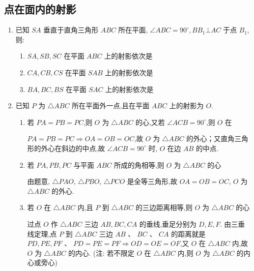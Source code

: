 \subsection*{点在面内的射影}
\begin{enumerate}
    \item 已知 ${SA}$ 垂直于直角三角形 ${ABC}$ 所在平面, $\angle {ABC} = {90}^{ \circ  },B{B}_{1}\bot {AC}$ 于点 ${B}_{1}$,则:
    \begin{enumerate}
        \item ${SA},{SB},{SC}$ 在平面 ${ABC}$ 上的射影依次是
        \item ${CA},{CB},{CS}$ 在平面 ${SAB}$ 上的射影依次是
        \item ${BA},{BC},{BS}$ 在平面 ${SAC}$ 上的射影依次是
    \end{enumerate}
    \item 已知 $P$ 为 $\bigtriangleup {ABC}$ 所在平面外一点,且在平面 ${ABC}$ 上的射影为 $O$.
    \begin{enumerate}
        \item 若 ${PA} = {PB} = {PC}$,则 $O$ 为 $\bigtriangleup  {ABC}$ 的心,又若 $\angle {ACB} = {90}^{ \circ  }$,则 $O$ 在
        \begin{jieda}
            ${PA} = {PB} = {PC} \Longrightarrow  {OA} = {OB} = {OC}$,故 $O$ 为 $\bigtriangleup  {ABC}$ 的外心；又直角三角形的外心在斜边的中点,故 $\angle {ACB} = {90}^{ \circ  }$ 时, $O$ 在边 ${AB}$ 的中点.
        \end{jieda}
        \item 若 ${PA},{PB},{PC}$ 与平面 ${ABC}$ 所成的角相等,则 $O$ 为 $\bigtriangleup  {ABC}$ 的心
        \begin{jieda}
            由题意, $\bigtriangleup {PAO}$, $\bigtriangleup {PBO}$, $\bigtriangleup {PCO}$ 是全等三角形,故 ${OA} = {OB} = {OC}$, $O$ 为 $\bigtriangleup {ABC}$ 的外心.
        \end{jieda}
        \item 若 $O$ 在 $\bigtriangleup {ABC}$ 内,且 $P$ 到 $\bigtriangleup {ABC}$ 的三边距离相等,则 $O$ 为 $\bigtriangleup {ABC}$ 的心
        \begin{jieda}
            过点 $O$ 作 $\bigtriangleup {ABC}$ 三边 ${AB},{BC},{CA}$ 的垂线,垂足分别为 $D,E,F$. 由三垂线定理,点 $P$ 到 $\bigtriangleup {ABC}$ 三边 ${AB}$ 、 ${BC}\text{ 、 }{CA}$ 的距离就是 ${PD},{PE},{PF}\text{ 、 }{PD} = {PE} = {PF} \Longrightarrow  {OD} = {OE} = {OF}$,又 $O$ 在 $\bigtriangleup {ABC}$ 内,故 $O$ 为 $\bigtriangleup {ABC}$ 的内心. (注: 若不限定 $O$ 在 $\bigtriangleup {ABC}$ 内,则 $O$ 为 $\bigtriangleup {ABC}$ 的内心或旁心)

\end{jieda}
\end{enumerate}
\end{enumerate}
